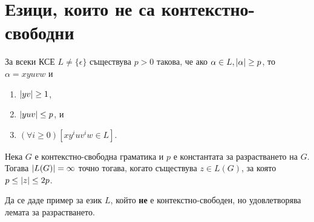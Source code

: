 \section{Езици, които не са контекстно-свободни}

\begin{lemma}
  \label{lem:pumping-context} 
  За всеки КСЕ $L\neq\{\epsilon\}$ съществува $p>0$ такова,
  че ако $\alpha\in L, \vert{\alpha}\vert \geq p$, то $\alpha=xyuvw$ и
  \begin{enumerate}
  \item
    $\vert{yv}\vert\geq 1$,
  \item
    $\vert{yuv}\vert\leq p$, и
  \item
    $(\forall i\geq 0)[xy^iuv^iw\in L]$.
\end{enumerate}
\end{lemma}

\begin{crl}
  Нека $G$ е контекстно-свободна граматика и $p$ е константата за разрастването на $G$.
  Тогава $\vert{L(G)}\vert = \infty$ точно тогава, когато съществува $z \in L(G)$, за която $p \leq \vert{z}\vert \leq 2p$.
\end{crl}

\begin{problem}
  Да се даде пример за език $L$, който {\bf не} е контекстно-свободен, но удовлетворява
  лемата за разрастването.
\end{problem}

